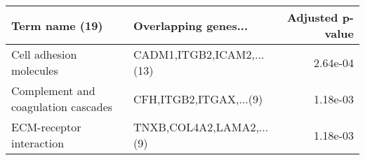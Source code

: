 \begin{tabular}{llr}
\toprule
                     Term name (19) &      Overlapping genes... &  Adjusted p-value \\
\midrule
            Cell adhesion molecules & CADM1,ITGB2,ICAM2,...(13) &          2.64e-04 \\
Complement and coagulation cascades &    CFH,ITGB2,ITGAX,...(9) &          1.18e-03 \\
           ECM-receptor interaction &  TNXB,COL4A2,LAMA2,...(9) &          1.18e-03 \\
\bottomrule
\end{tabular}
